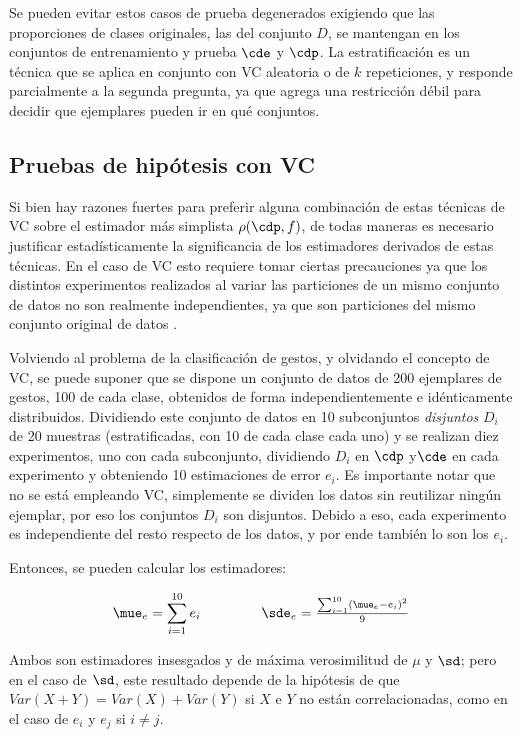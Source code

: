 Se pueden evitar estos casos de prueba degenerados exigiendo que las proporciones de clases originales, las del conjunto $D$, se mantengan en los conjuntos de entrenamiento y prueba $\cde$ y $\cdp$. La estratificación es un técnica que se aplica en conjunto con VC aleatoria o de $k$ repeticiones, y responde parcialmente a la segunda pregunta, ya que agrega una restricción débil para decidir que ejemplares pueden ir en qué conjuntos.
 


\subsection{Pruebas de hipótesis con VC}

Si bien hay razones fuertes para preferir alguna combinación de estas técnicas de VC sobre el estimador más simplista $\rho(\cdp,f)$, de todas maneras es necesario justificar estadísticamente la significancia de los estimadores derivados de estas técnicas.  En el caso de VC esto requiere tomar ciertas precauciones ya que los distintos experimentos realizados al variar las particiones de un mismo conjunto de datos no son realmente independientes, ya que son particiones del mismo conjunto original de datos \cite{bengio2004,dietterich1998}.

Volviendo al problema de la clasificación de gestos, y olvidando el concepto de VC, se puede suponer que se dispone un conjunto de datos de 200 ejemplares de gestos, 100 de cada clase, obtenidos de forma independientemente e idénticamente distribuidos. Dividiendo este conjunto de datos en 10 subconjuntos \textit{disjuntos} $D_i$ de 20 muestras (estratificadas, con 10 de cada clase cada uno) y se realizan diez experimentos, uno con cada subconjunto,  dividiendo $D_i$ en $\cdp$ y$\cde$ en cada experimento y obteniendo 10 estimaciones de error $e_i$. Es importante notar que no se está empleando VC, simplemente se dividen los datos sin reutilizar ningún ejemplar, por eso los conjuntos $D_i$ son disjuntos. Debido a eso, cada experimento es independiente del resto respecto de los datos, y por ende también lo son los $e_i$. 

Entonces, se pueden calcular los estimadores:

\begin{equation}
  \mue_e=\sum_{i=1}^{10} e_i$  \qquad \qquad  $\sde_e= \frac{\sum_{i=1}^{10} (\mue_e-e_i)^2 }{9}
\end{equation}

Ambos son estimadores insesgados y de máxima verosimilitud de $\mu$ y $\sd$; pero en el caso de $\sd$, este resultado depende de la hipótesis de que $Var(X+Y)= Var(X) + Var(Y)$ si $X$ e $Y$ no están correlacionadas, como en el caso de $e_i$ y $e_j$ si $i \neq j$. 

